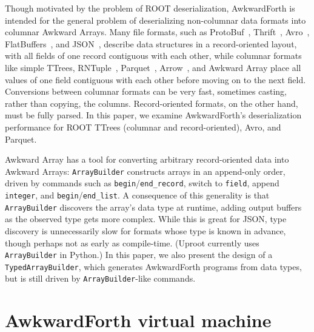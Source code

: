 \documentclass{webofc}
\begin{document}
Though motivated by the problem of ROOT deserialization, AwkwardForth is intended for the general problem of deserializing non-columnar data formats into columnar Awkward Arrays. Many file formats, such as ProtoBuf~\cite{protobuf}, Thrift~\cite{thrift}, Avro~\cite{avro}, FlatBuffers~\cite{flatbuffers}, and JSON~\cite{json}, describe data structures in a record-oriented layout, with all fields of one record contiguous with each other, while columnar formats like simple TTrees, RNTuple~\cite{rntuple}, Parquet~\cite{parquet}, Arrow~\cite{arrow}, and Awkward Array place all values of one field contiguous with each other before moving on to the next field. Conversions between columnar formats can be very fast, sometimes casting, rather than copying, the columns. Record-oriented formats, on the other hand, must be fully parsed. In this paper, we examine AwkwardForth's deserialization performance for ROOT TTrees (columnar and record-oriented), Avro, and Parquet.

Awkward Array has a tool for converting arbitrary record-oriented data into Awkward Arrays: {\tt ArrayBuilder} constructs arrays in an append-only order, driven by commands such as {\tt begin}/{\tt end\_record}, switch to {\tt field}, append {\tt integer}, and {\tt begin}/{\tt end\_list}. A consequence of this generality is that {\tt ArrayBuilder} discovers the array's data type at runtime, adding output buffers as the observed type gets more complex. While this is great for JSON, type discovery is unnecessarily slow for formats whose type is known in advance, though perhaps not as early as compile-time. (Uproot currently uses {\tt ArrayBuilder} in Python.) In this paper, we also present the design of a {\tt TypedArrayBuilder}, which generates AwkwardForth programs from data types, but is still driven by {\tt ArrayBuilder}-like commands.

\vspace{-0.25 cm}
\section{AwkwardForth virtual machine}
\end{document}
